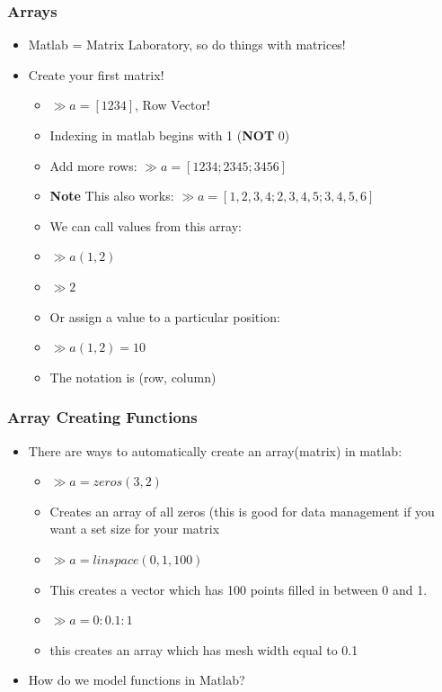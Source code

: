 \documentclass{beamer}
\newcommand{\B}{\textbf}
\begin{document}
\begin{frame}
\frametitle{Arrays} 
\begin{itemize} 
\item Matlab = Matrix Laboratory, so do things with matrices! 
\item Create your first matrix! 
\begin{itemize}
\item $\gg a = [1 2 3 4]$, Row Vector! 
\item Indexing in matlab begins with 1 (\B{NOT} 0) 
\item Add more rows: $\gg a = [1 2 3 4; 2 3 4 5; 3 4 5 6]$
\item \B{Note} This also works: $\gg a = [1,2,3,4;2,3,4,5;3,4,5,6]$
\item We can call values from this array: 
\item $\gg a(1,2)$
\item $\gg 2$ 
\item Or assign a value to a particular position: 
\item $\gg a(1,2)=10$  
\item The notation is (row, column)
\end{itemize}


\end{itemize} 
\end{frame}




\begin{frame}
\frametitle{Array Creating Functions}

\begin{itemize}
\item There are ways to automatically create an array(matrix) in matlab:
\begin{itemize}
\item $\gg a = zeros(3,2)$ 
\item Creates an array of all zeros (this is good for data management if you want a set size for your matrix
\item $\gg a = linspace(0,1,100)$ 
\item This creates a vector which has 100 points filled in between 0 and 1. 
\item $\gg a = 0:0.1:1$ 
\item this creates an array which has mesh width equal to 0.1 
\end{itemize}
\item How do we model functions in Matlab? 
\end{itemize}



\end{frame} 
\end{document}
